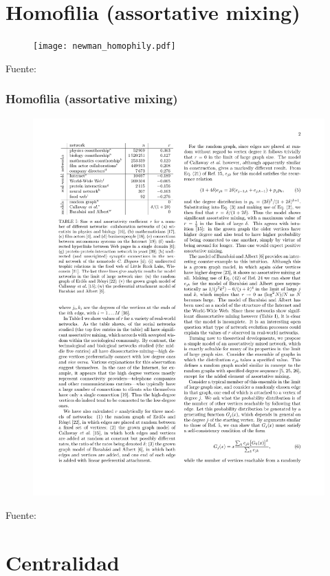 \documentclass[10pt,handout]{beamer}
\begin{document}
\section{Homofilia (assortative mixing)}


\begin{frame}
\begin{figure}
\texttt{[image: newman\_homophily.pdf]}
\end{figure}
{\footnotesize Fuente: \cite{newman2003structure}}
\end{frame}

\begin{frame}
\frametitle{Homofilia (assortative mixing)}
\begin{figure}
\centering
\includegraphics[trim= 1cm 16cm 11cm 1cm, clip=true, width=.5\linewidth]{assortative_mix.pdf}
\end{figure}
{\footnotesize Fuente: \cite{newman2002assortative}}
\end{frame}


\section{Centralidad}
\end{document}
